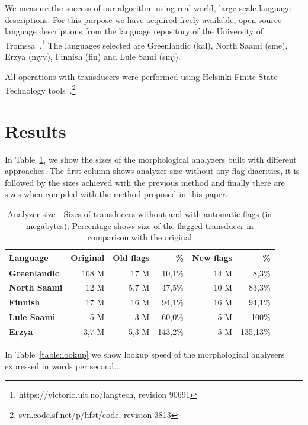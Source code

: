 \documentclass[11pt]{article}
\begin{document}
We measure the success of our algorithm using real-world, large-scale
language descriptions. For this purpose we have acquired freely
available, open source language descriptions from the language repository of the University of 
Tromssa~\cite{moshagen2013building}.\footnote{https://victorio.uit.no/langtech, revision 90691} The
languages selected are Greenlandic (kal), North Saami (sme), Erzya
(myv), Finnish (fin) and Lule Sami (smj).

All operations with transducers were performed using Helsinki Finite
State Technology tools~\cite{linden2011}.\footnote{svn.code.sf.net/p/hfst/code, revision 3813}



\section{Results}
In Table~\ref{table:sizes}, we show the sizes of the morphological analyzers built with different approaches. The first column shows analyzer 
size without any flag diacritics, it is followed by the sizes achieved with the previous method and finally there are sizes when 
compiled with the method proposed in this paper.
\begin{table}
    \centering
    \begin{tabular}{|l|r|r|r|r|r|}
        \hline
        \bf Language & \bf Original & \bf Old flags  & \bf \% & \bf New flags  & \bf \% \\
        \hline\hline
        \bf Greenlandic &   168 M  & 17 M & 10,1\% &  14 M & 8,3\% \\
        \bf North Saami &   12 M    & 5,7 M & 47,5\% & 10 M & 83,3\% \\
        \bf Finnish &   17 M    & 16 M & 94,1\% & 16 M & 94,1\% \\
        \bf Lule Saami  &   5 M    & 3 M & 60,0\% & 5 M & 100\% \\
        \bf Erzya       &   3,7 M    & 5,3 M & 143,2\% &  5 M & 135,13\% \\
        \hline
    \end{tabular}
    \caption{Analyzer size - Sizes of transducers without and with automatic flags (in megabytes); Percentage shows size of the flagged transducer in comparison with the original
    \label{table:sizes}}
\end{table}

In Table~\ref{table:lookup} we show lookup speed of the morphological analysers expressed in words per second...
\end{document}
